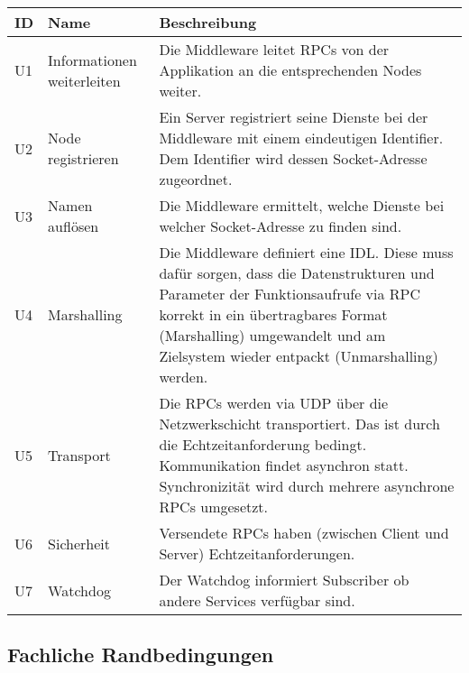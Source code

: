 \begin{tabular}{|p{1.5cm}|p{4cm}|p{8.5cm}|}
	\hline
	\textbf{ID} & \textbf{Name} & \textbf{Beschreibung} \\
	\hline
	U1 & Informationen weiterleiten & Die Middleware leitet RPCs von der Applikation an die entsprechenden Nodes weiter. \\
	\hline
	U2 & Node registrieren & Ein Server registriert seine Dienste bei der Middleware mit einem eindeutigen Identifier. Dem Identifier wird dessen Socket-Adresse zugeordnet. \\
	\hline
	U3 & Namen auflösen & Die Middleware ermittelt, welche Dienste bei welcher Socket-Adresse zu finden sind.\\
	\hline
	U4 & Marshalling & Die Middleware definiert eine IDL. Diese muss dafür sorgen, dass die Datenstrukturen und Parameter der Funktionsaufrufe via RPC korrekt in ein übertragbares Format (Marshalling) umgewandelt und am Zielsystem wieder entpackt (Unmarshalling) werden. \\
	\hline
	U5 & Transport & Die RPCs werden via UDP über die Netzwerkschicht transportiert. Das ist durch die Echtzeitanforderung bedingt. Kommunikation findet asynchron statt. Synchronizität wird durch mehrere asynchrone RPCs umgesetzt.\\
	\hline 
	U6 & Sicherheit & Versendete RPCs haben (zwischen Client und Server) Echtzeitanforderungen. \\
	\hline
	U7 & Watchdog & Der Watchdog informiert Subscriber ob andere Services verfügbar sind.\\      %
	\hline
	
\end{tabular}

\subsection{Fachliche Randbedingungen}

